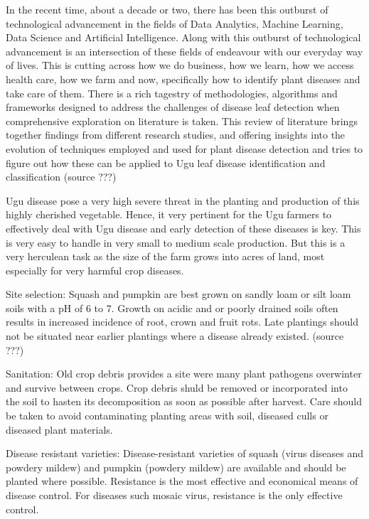 In the recent time, about a decade or two, there has been this outburst of technological advancement in the fields of Data Analytics, Machine Learning, Data Science and Artificial Intelligence. Along with this outburst of technological advancement is an intersection of these fields of endeavour with our everyday way of lives. This is cutting across how we do business, how we learn, how we access health care, how we farm and now, specifically how to identify plant diseases and take care of them. There is a rich tagestry of methodologies, algorithms and frameworks designed to address the challenges of disease leaf detection when comprehensive exploration on literature is taken. This review of literature brings together findings from different research studies, and offering insights into the evolution of techniques employed and used for plant disease detection and tries to figure out how these can be applied to Ugu leaf disease identification and classification (source ???)

Ugu disease pose a very high severe threat in the planting and production of this highly cherished vegetable. Hence, it very pertinent for the Ugu farmers to effectively deal with Ugu disease and early detection of these diseases is key. This is very easy to handle in very small to medium scale production. But this is a very herculean task as the size of the farm grows into acres of land, most especially for very harmful crop diseases.

Site selection: Squash and pumpkin are best grown on sandly loam or silt loam soils with a pH of 6 to 7. Growth on acidic and or poorly drained soils often results in increased incidence of root, crown and fruit rots. Late plantings should not be situated near earlier plantings  where a disease already existed. (source ???)

Sanitation: Old crop debris provides a site were many plant pathogens overwinter and survive between crops. Crop debris shuld be removed or incorporated into the soil to hasten its decomposition as soon as possible after harvest. Care should be taken to avoid contaminating planting areas with soil, diseased culls or diseased plant materials. 

Disease resistant varieties: Disease-resistant varieties of squash (virus  diseases and powdery mildew) and pumpkin (powdery mildew) are available and should be planted where possible. Resistance is the most effective and economical means of disease control. For diseases such mosaic virus, resistance is the only effective control. 


